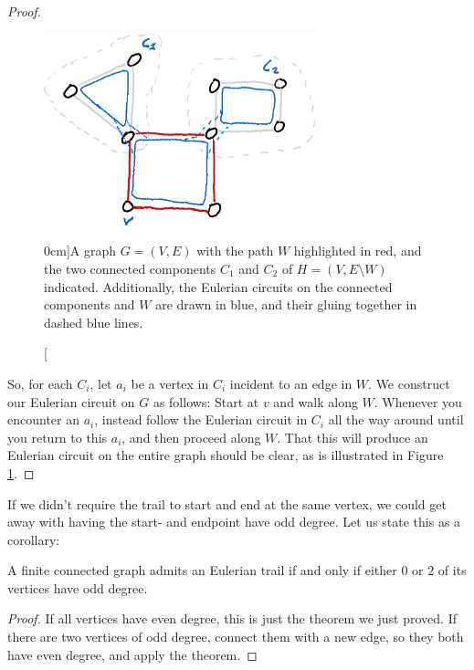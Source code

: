 \documentclass[nobib]{tufte-handout}
\begin{document}
\begin{theorem}[Euler (1736)]
\begin{proof}
    \begin{figure}
      \centering
      \includegraphics[width=0.7\textwidth]{graphics/L2_eulerianity_subgraphs/eulerianity_gluing_circuits.png}
      \caption[][0cm]{A graph $G = (V,E)$ with the path $W$ highlighted in red, and the two connected components $C_1$ and $C_2$ of $H = (V, E \setminus W)$ indicated. Additionally, the Eulerian circuits on the connected components and $W$ are drawn in blue, and their gluing together in dashed blue lines.}
      \label{fig:gluing_eulerian_circuits}
    \end{figure}

    So, for each $C_i$, let $a_i$ be a vertex in $C_i$ incident to an edge in $W$. We construct our Eulerian circuit on $G$ as follows: Start at $v$ and walk along $W$. Whenever you encounter an $a_i$, instead follow the Eulerian circuit in $C_i$ all the way around until you return to this $a_i$, and then proceed along $W$. That this will produce an Eulerian circuit on the entire graph should be clear, as is illustrated in Figure \ref{fig:gluing_eulerian_circuits}.
  \end{proof}
\end{theorem}

If we didn't require the trail to start and end at the same vertex, we could get away with having the start- and endpoint have odd degree. Let us state this as a corollary:

\begin{corollary}
  A finite connected graph admits an Eulerian trail if and only if either $0$ or $2$ of its vertices have odd degree.

  \begin{proof}
    If all vertices have even degree, this is just the theorem we just proved. If there are two vertices of odd degree, connect them with a new edge, so they both have even degree, and apply the theorem.
  \end{proof}
\end{corollary}
\end{document}

